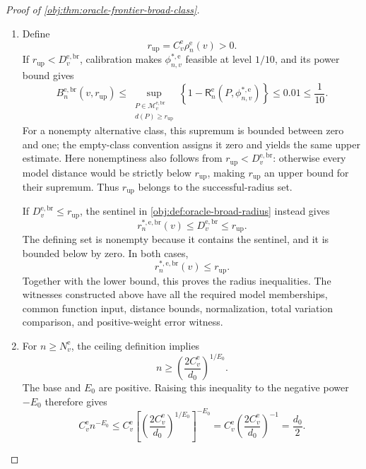\begin{proof}[Proof of \cref{obj:thm:oracle-frontier-broad-class}]
\begin{enumerate}
\item Define
\[
r_{\mathrm{up}}=C_v^{\mathrm e}\rho_n^{\mathrm e}(v)>0.
\]
If \(r_{\mathrm{up}}<D_v^{\mathrm{e,br}}\), calibration makes
\(\phi^{*,\mathrm e}_{n,v}\) feasible at level \(1/10\), and its power bound gives
\[
B_n^{\mathrm{e,br}}(v,r_{\mathrm{up}})
\le
\sup_{\substack{P\in\mathcal M_v^{\mathrm{e,br}}\\d(P)\ge r_{\mathrm{up}}}}
\left\{1-\mathsf R_n^{\mathrm e}(P,\phi^{*,\mathrm e}_{n,v})\right\}
\le0.01\le\frac1{10}.
\]
For a nonempty alternative class, this supremum is bounded between zero and one; the empty-class convention assigns it zero and yields the same upper estimate. Here nonemptiness also follows from
\(r_{\mathrm{up}}<D_v^{\mathrm{e,br}}\): otherwise every model distance would be strictly below \(r_{\mathrm{up}}\), making \(r_{\mathrm{up}}\) an upper bound for their supremum. Thus \(r_{\mathrm{up}}\) belongs to the successful-radius set.

If \(D_v^{\mathrm{e,br}}\le r_{\mathrm{up}}\), the sentinel in
\cref{obj:def:oracle-broad-radius} instead gives
\[
r_n^{*,\mathrm{e,br}}(v)
\le D_v^{\mathrm{e,br}}\le r_{\mathrm{up}}.
\]
The defining set is nonempty because it contains the sentinel, and it is bounded below by zero. In both cases,
\[
r_n^{*,\mathrm{e,br}}(v)\le r_{\mathrm{up}}.
\]
Together with the lower bound, this proves the radius inequalities. The witnesses constructed above have all the required model memberships, common function input, distance bounds, normalization, total variation comparison, and positive-weight error witness.

\item For \(n\ge N_v^{\mathrm e}\), the ceiling definition implies
\[
n\ge\left(\frac{2C_v^{\mathrm e}}{d_0}\right)^{1/E_0}.
\]
The base and \(E_0\) are positive. Raising this inequality to the negative power \(-E_0\) therefore gives
\[
C_v^{\mathrm e}n^{-E_0}
\le
C_v^{\mathrm e}
\left[
\left(\frac{2C_v^{\mathrm e}}{d_0}\right)^{1/E_0}
\right]^{-E_0}
=
C_v^{\mathrm e}\left(\frac{2C_v^{\mathrm e}}{d_0}\right)^{-1}
=\frac{d_0}{2}.
\]


\end{enumerate}
\end{proof}

